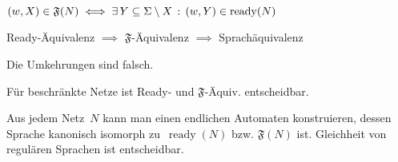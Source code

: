 \documentclass{cheat-sheet}
\DeclareMathOperator{\ready}{ready} %
\newcommand{\Failure}{\mathfrak{F}} %
\begin{document}
\begin{lem}
  $
    (w, X) \in \Failure(N) \iff \ex{Y \subseteq \Sigma \setminus X} (w, Y) \in \ready(N)
  $
\end{lem}

\begin{satz}
  Ready-Äquivalenz $\implies$ $\Failure$-Äquivalenz $\implies$ Sprachäquivalenz
\end{satz}

\begin{bem}
  Die Umkehrungen sind falsch.
\end{bem}

\begin{satz}
  Für beschränkte Netze ist Ready- und $\Failure$-Äquiv. entscheidbar.
\end{satz}

\begin{beweisidee}
  Aus jedem Netz~$N$ kann man einen endlichen Automaten konstruieren, dessen Sprache kanonisch isomorph zu~$\ready(N)$ bzw. $\Failure(N)$ ist.
  Gleichheit von regulären Sprachen ist entscheidbar.
\end{beweisidee}

\end{document}
